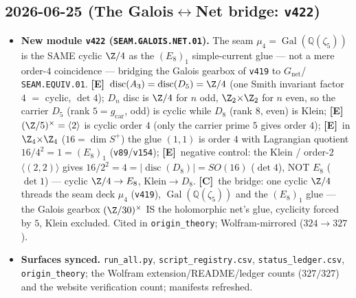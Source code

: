 \documentclass[11pt]{article}
\providecommand{\mE}{\textbf{[E]}}\providecommand{\mC}{\textbf{[C]}}
\providecommand{\vref}[1]{\texttt{#1}}
\providecommand{\gcar}{g_{\mathrm{car}}}\providecommand{\Nfam}{N_{\mathrm{fam}}}
\begin{document}
\subsection*{2026-06-25 (The Galois$\leftrightarrow$Net bridge: \texttt{v422})}
\begin{itemize}
\item \textbf{New module \texttt{v422} (\texttt{SEAM.GALOIS.NET.01}).} The seam
$\mu_4=\operatorname{Gal}(\mathbb Q(\zeta_5))$ is the SAME cyclic $\Z/4$ as the $(E_8)_1$ simple-current glue
--- not a mere order-$4$ coincidence --- bridging the Galois gearbox of \vref{v419} to $G_{\mathrm{net}}$/%
\texttt{SEAM.EQUIV.01}. \mE\ $\operatorname{disc}(A_3)=\operatorname{disc}(D_5)=\Z/4$ (one Smith invariant
factor $4$ $=$ cyclic, $\det4$); $D_n$ disc is $\Z/4$ for $n$ odd, $\Z_2{\times}\Z_2$ for $n$ even, so the
carrier $D_5$ (rank $5=\gcar$, odd) is cyclic while $D_8$ (rank $8$, even) is Klein; \mE\
$(\Z/5)^\times=\langle2\rangle$ is cyclic order $4$ (only the carrier prime $5$ gives order $4$); \mE\ in
$\Z_4{\times}\Z_4$ ($16=\dim S^+$) the glue $(1,1)$ is order $4$ with Lagrangian quotient
$16/4^2=1=(E_8)_1$ (\vref{v89}/\vref{v154}); \mE\ negative control: the Klein / order-$2$
$\langle(2,2)\rangle$ gives $16/2^2=4=|\!\operatorname{disc}(D_8)|=SO(16)$ ($\det4$), NOT $E_8$ ($\det1$) ---
cyclic $\Z/4\to E_8$, Klein$\to D_8$. \mC\ the bridge: one cyclic $\Z/4$ threads the seam deck $\mu_4$
(\vref{v419}), $\operatorname{Gal}(\mathbb Q(\zeta_5))$ and the $(E_8)_1$ glue --- the Galois gearbox
$(\Z/30)^\times$ IS the holomorphic net's glue, cyclicity forced by $5$, Klein excluded. Cited in
\texttt{origin\_theory}; Wolfram-mirrored ($324\to327$).
\item \textbf{Surfaces synced.} \texttt{run\_all.py}, \texttt{script\_registry.csv},
\texttt{status\_ledger.csv}, \texttt{origin\_theory}; the Wolfram extension/README/ledger counts
($327/327$) and the website verification count; manifests refreshed.
\end{itemize}
\end{document}
